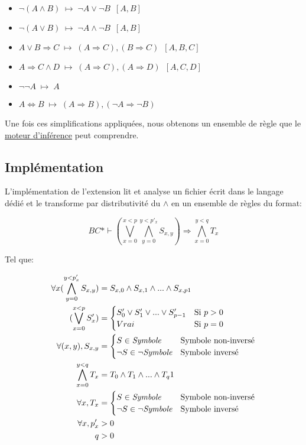 \documentclass[12pt]{article}
\begin{document}
\begin{itemize}
  \item $\neg(A \land B) \; \mapsto \; \neg{A} \lor \neg{B} \enspace [A, B]$
  \item $\neg(A \lor B) \; \mapsto \; \neg{A} \land \neg{B} \enspace [A, B]$
  \item $A \lor B \Rightarrow C \; \mapsto \; (A \Rightarrow C), (B \Rightarrow C) \enspace [A, B, C]$
  \item $A \Rightarrow C \land D \; \mapsto \; (A \Rightarrow C), (A \Rightarrow D) \enspace [A, C, D]$
  \item $\neg \neg A \; \mapsto \; A$
  \item $A \Leftrightarrow B \; \mapsto \; (A \Rightarrow B), (\neg A \Rightarrow \neg B)$
\end{itemize}

Une fois ces simplifications appliquées, nous obtenons un ensemble de règle que le \hyperref[MI]{moteur d'inférence} peut comprendre.

\subsection{Implémentation}

L'implémentation de l'extension lit et analyse un fichier écrit dans le langage dédié et le transforme par distributivité du $\land$ en un ensemble de règles du format:

\[BC* \vdash (\bigvee_{x=0}^{x < p}\bigwedge_{y=0}^{y < p'_x} S_{x,y}) \Rightarrow \bigwedge_{x=0}^{y < q} T_x\]

Tel que:

\begin{align}
  \forall x (\bigwedge_{y=0}^{y < p'_x} S_{x,y})
    &= S_{x,0} \land S_{x,1} \land ... \land S_{x,p\-1} \\
  (\bigvee_{x=0}^{x < p} S_x')
    &= \begin{cases}
      S_0' \lor S_1' \lor ... \lor S_{p-1}' & \text{Si } p > 0 \\
      Vrai & \text{Si } p = 0
    \end{cases} \\
  \forall (x, y), S_{x,y}
    &= \begin{cases}
      S \in \textit{Symbole} & \text{Symbole non-inversé} \\
      \neg S \in \neg \textit{Symbole} & \text{Symbole inversé}
    \end{cases} \\
  \bigwedge_{x=0}^{y < q} T_x
    &= T_0 \land T_1 \land ... \land T_q\-1 \\
  \forall x, T_x
    &= \begin{cases}
      S \in \textit{Symbole} & \text{Symbole non-inversé} \\
      \neg S \in \neg \textit{Symbole} & \text{Symbole inversé}
    \end{cases} \\
  \forall x, p'_x &> 0 \\
  q &> 0
\end{align}
\end{document}
